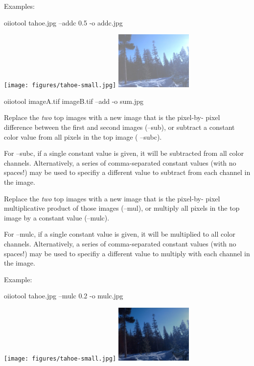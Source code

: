 \noindent Examples:
\begin{code}
    oiiotool tahoe.jpg --addc 0.5 -o addc.jpg
\end{code}
\spc \texttt{[image: figures/tahoe-small.jpg]}
\raisebox{40pt}{\large $\rightarrow$}
\includegraphics[width=1.5in]{figures/addc.jpg} \\

\vspace{12pt}

\begin{code}
    oiiotool imageA.tif imageB.tif --add -o sum.jpg
\end{code}
\apiend

Replace the \emph{two} top images with a new image that is the pixel-by-
pixel difference between the first and second images ({\cf --sub}), or
subtract a constant color value from all pixels in the top image ({\cf
--subc}).

For {\cf --subc}, if a single constant value is given, it will be subtracted
from all color channels. Alternatively, a series of comma-separated constant
values (with no spaces!) may be used to specifiy a different value to
subtract from each channel in the image.
\apiend

Replace the \emph{two} top images with a new image that is the pixel-by-
pixel multiplicative product of those images ({\cf --mul}), or multiply all
pixels in the top image by a constant value ({\cf --mulc}).

For {\cf --mulc}, if a single constant value is given, it will be multiplied
to all color channels. Alternatively, a series of comma-separated constant
values (with no spaces!) may be used to specifiy a different value to
multiply with each channel in the image.

\noindent Example:
\begin{code}
    oiiotool tahoe.jpg --mulc 0.2 -o mulc.jpg
\end{code}
\spc \texttt{[image: figures/tahoe-small.jpg]}
\raisebox{40pt}{\large $\rightarrow$}
\includegraphics[width=1.5in]{figures/mulc.jpg} \\
\apiend

